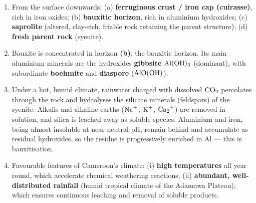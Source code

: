 \documentclass[11pt]{article}
\begin{document}
\begin{corrige}
\begin{enumerate}
\item From the surface downwards: (a) \textbf{ferruginous crust / iron cap (cuirasse)}, rich in iron oxides; (b) \textbf{bauxitic horizon}, rich in aluminium hydroxides; (c) \textbf{saprolite} (altered, clay-rich, friable rock retaining the parent structure); (d) \textbf{fresh parent rock} (syenite).
\item Bauxite is concentrated in horizon \textbf{(b)}, the bauxitic horizon. Its main aluminium minerals are the hydroxides \textbf{gibbsite} $\ce{Al(OH)3}$ (dominant), with subordinate \textbf{boehmite} and \textbf{diaspore} ($\ce{AlO(OH)}$).
\item Under a hot, humid climate, rainwater charged with dissolved $\ce{CO2}$ percolates through the rock and hydrolyses the silicate minerals (feldspars) of the syenite. Alkalis and alkaline earths ($\ce{Na+}$, $\ce{K+}$, $\ce{Ca2+}$) are removed in solution, and silica is leached away as soluble species. Aluminium and iron, being almost insoluble at near-neutral pH, remain behind and accumulate as residual hydroxides, so the residue is progressively enriched in Al — this is bauxitisation.
\item Favourable features of Cameroon's climate: (i) \textbf{high temperatures} all year round, which accelerate chemical weathering reactions; (ii) \textbf{abundant, well-distributed rainfall} (humid tropical climate of the Adamawa Plateau), which ensures continuous leaching and removal of soluble products.
\end{enumerate}
\end{corrige}
\end{document}
